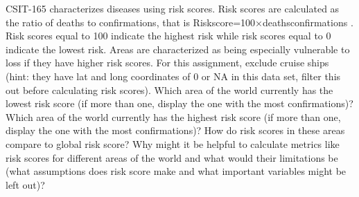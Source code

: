 \documentclass[
]{article}
\begin{document}
CSIT-165 characterizes diseases using risk scores. Risk scores are
calculated as the ratio of deaths to confirmations, that is
Riskscore=100×deathsconfirmations . Risk scores equal to 100 indicate
the highest risk while risk scores equal to 0 indicate the lowest risk.
Areas are characterized as being especially vulnerable to loss if they
have higher risk scores. For this assignment, exclude cruise ships
(hint: they have lat and long coordinates of 0 or NA in this data set,
filter this out before calculating risk scores). Which area of the world
currently has the lowest risk score (if more than one, display the one
with the most confirmations)? Which area of the world currently has the
highest risk score (if more than one, display the one with the most
confirmations)? How do risk scores in these areas compare to global risk
score? Why might it be helpful to calculate metrics like risk scores for
different areas of the world and what would their limitations be (what
assumptions does risk score make and what important variables might be
left out)?
\end{document}
